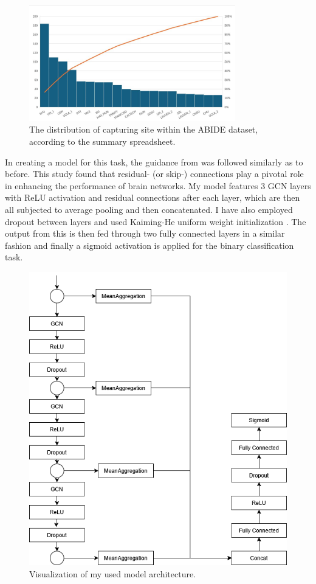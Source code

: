 	\begin{figure}[!h]
		\centering
		\includegraphics[width=0.8\textwidth]{figures/ABIDE-sites.jpg}
		\caption{The distribution of capturing site within the ABIDE dataset, according to the summary spreadsheet.}
		\label{fig:distribution}
	\end{figure}
	
	In creating a model for this task, the guidance from \cite{said2023neurograph} was followed similarly as to before. This study found that residual- (or skip-) connections play a pivotal role in enhancing the performance of brain networks. My model features 3 GCN layers with ReLU activation and residual connections after each layer, which are then all subjected to average pooling and then concatenated. I have also employed dropout between layers and used Kaiming-He uniform weight initialization \cite{he2015delving}. The output from this is then fed through two fully connected layers in a similar fashion and finally a sigmoid activation is applied for the binary classification task. 
	
	\begin{figure}[!h]
		\centering
		\includegraphics[width=\textwidth]{figures/model.png}
		\caption{Visualization of my used model architecture.}
		\label{fig:model}
	\end{figure}
	
